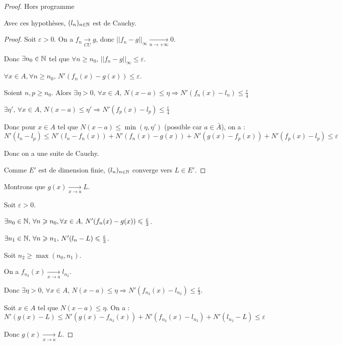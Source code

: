 \begin{proof}
    Hors programme 

     Avec ces hypothèses, $(l_n)_{n \in \mathbb{N}}$ est de Cauchy.

    \begin{proof}
        Soit $\varepsilon > 0$. On a $f_n \xrightarrow[CU]{} g$, donc $||f_n - g||_{\infty} \xrightarrow[n\to +\infty]{} 0$.

        Donc $\exists n_0 \in \mathbb{N}$ tel que $\forall n \geqslant n_0, \, || f_n - g ||_{\infty} \leqslant \varepsilon$.

        $\forall x \in A, \forall n \geqslant n_0, \, N'(f_n(x) - g(x)) \leqslant \varepsilon$.

        Soient $n, p \geqslant n_0$. Alors $\exists \eta > 0, \, \forall x \in A, \, N(x - a) \leqslant \eta \Rightarrow N'(f_n(x) - l_n) \leqslant \frac \varepsilon 4$

        $\exists \eta ', \, \forall x \in A, \, N(x - a) \leqslant \eta ' \Rightarrow N'(f_p(x) - l_p) \leqslant \frac \varepsilon 4$
    
        Donc pour $x \in A$ tel que $N(x - a) \leqslant \min(\eta, \eta ')$ (possible car $a \in \bar A$), on a :
        $$ N'(l_n - l_p) \leqslant N'(l_n - f_n(x)) + N'(f_n(x) - g(x)) + N'(g(x) - f_p(x)) + N'(f_p(x) - l_p) \leqslant \varepsilon$$

        Donc on a une suite de Cauchy. 

        Comme $E'$ est de dimension finie, $(l_n)_{n \in \mathbb{N}}$ converge vers $L \in E'$.

        
    \end{proof}

    Montrons que $g(x) \xrightarrow[x \to a]{} L$.

        Soit $\varepsilon > 0$. 

        $\exists n_0 \in \mathbb{N}, \, \forall n \geqslant n_0, \forall x \in A, \, N'(f_n(x) - g(x)) \leqslant \frac \varepsilon 3$. 

        $\exists n_1 \in \mathbb{N}, \, \forall n \geqslant n_1, \, N'(l_n - L) \leqslant \frac \varepsilon 3$.

        Soit $n_2 \geqslant \max(n_0, n_1)$. 

        On a $f_{n_2}(x) \xrightarrow[x \to a]{} l_{n_2}$.

        Donc $\exists \eta > 0, \, \forall x \in A, \, N(x - a) \leqslant \eta \Rightarrow N'(f_{n_2}(x) - l_{n_2}) \leqslant \frac \varepsilon 3$.

        Soit $x \in A$ tel que $N(x - a) \leqslant \eta$. On a : 
        $$N'(g(x) - L) \leqslant N'(g(x) - f_{n_2}(x)) + N'(f_{n_2}(x) - l_{n_2}) + N'(l_{n_2} - L) \leqslant \varepsilon$$

        Donc $g(x) \xrightarrow[x \to a]{} L$.
\end{proof}


